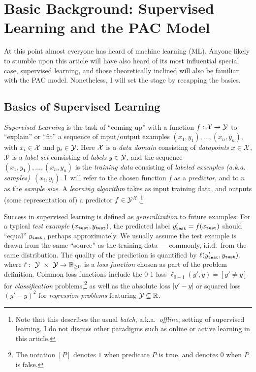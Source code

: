 \section{Basic Background: Supervised Learning and the PAC Model}
\label{sec:background}

At this point almost everyone has heard of machine learning (ML). Anyone likely to stumble upon this article will have also heard of its most influential special case, supervised learning, and those theoretically inclined will also be familiar with the PAC model. Nonetheless, I will set the stage by  recapping the basics.

\subsection{Basics of Supervised Learning}%

\emph{Supervised Learning} is the task of ``coming up'' with a function $f: \mathcal{X} \to \mathcal{Y}$ to ``explain'' or ``fit'' a sequence of input/output examples   $(x_1,y_1), \ldots, (x_n,y_n)$, with $x_i \in \mathcal{X}$ and $y_i \in \mathcal{Y}$.  Here $\mathcal{X}$ is a \emph{data domain} consisting of \emph{datapoints} $x \in \mathcal{X}$, $\mathcal{Y}$ is a \emph{label set} consisting of \emph{labels} $y \in \mathcal{Y}$, and the sequence $(x_1,y_1),\ldots,(x_n,y_n)$ is the \emph{training data} consisting of \emph{labeled examples (a.k.a. samples)}~$(x_i,y_i)$.  I~will refer to the chosen function $f$ as a \emph{predictor}, and to $n$ as the \emph{sample size}. A \emph{learning algorithm} takes as input training data, and outputs (some representation of) a predictor $f \in \mathcal{Y}^{\mathcal{X}}$.\footnote{Note that this describes the usual \emph{batch}, a.k.a.~\emph{offline}, setting of supervised learning. I do not discuss other paradigms such as online or active learning in this article.} 



Success in supervised learning is defined as \emph{generalization} to  future examples: For a typical \emph{test example}  $(x_{\mathtt{test}},y_{\mathtt{test}})$, the predicted label $y'_{\mathtt{test}}=f(x_{\mathtt{test}})$ should ``equal'' $y_{\mathtt{test}}$, perhaps approximately. We usually assume the test example is drawn from the same  ``source'' as the training data  --- commonly, i.i.d.~from the same distribution. The quality of the prediction is quantified by $\ell(y'_{\mathtt{test}},y_{\mathtt{test}})$, where $\ell:~\mathcal{Y}~\times~\mathcal{Y} \to \mathbb{R}_{\geq 0}$ is a \emph{loss function} chosen as part of the problem definition. Common loss functions include the 0-1 loss $\ell_{0-1}(y',y) = [y' \neq y]$ for \emph{classification} problems,\footnote{The notation $[P]$ denotes $1$ when predicate $P$ is true, and denotes $0$ when $P$ is false.} as well as the absolute loss $|y'-y|$ or squared loss $(y'-y)^2$ for \emph{regression problems} featuring $\mathcal{Y}  \subseteq \mathbb{R}$.

